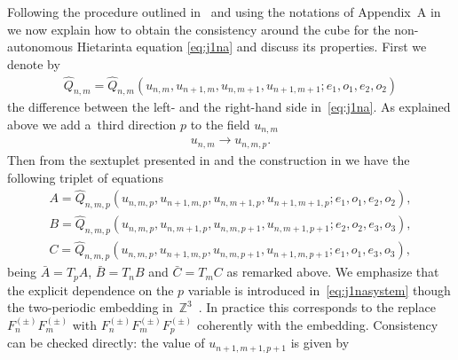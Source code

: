 \documentclass[pdftex]{sigma}
\numberwithin{equation}{section}
\newcommand{\Z}{\mathbb{Z}}
\begin{document}
Following the procedure outlined in~\cite{Boll2011,Boll2012a,Boll2012b}
and using the notations of Appendix~A in~\cite{GSL_general} we now explain
how to obtain the consistency around the cube for the
non-autonomous Hietarinta equation \eqref{eq:j1na} and discuss its
properties.
First we denote by
\begin{gather*}
 \widehat{Q}_{n,m} = \widehat{Q}_{n,m} ( u_{n,m},u_{n+1,m},u_{n,m+1},u_{n+1,m+1};e_{1},o_{1},e_{2},o_{2} ) %
\end{gather*}
the dif\/ference between the left- and the right-hand side in~\eqref{eq:j1na}. As explained above we add a~third direction $p$ to the f\/ield $u_{n,m}$
\begin{gather*}
 u_{n,m} \to u_{n,m,p}. %
\end{gather*}
Then from the sextuplet presented in \cite{Hietarinta2004}
and the construction in \cite{Boll2011,Boll2012a,Boll2012b,GSL_general}
we have the following triplet of equations
\begin{subequations} \label{eq:j1nasystem}
 \begin{gather}
 A= \widehat{Q}_{n,m,p}( u_{n,m,p},u_{n+1,m,p},u_{n,m+1,p},u_{n+1,m+1,p};e_{1},o_{1},e_{2},o_{2} ), \label{eq:j1Aeq} \\
 B= \widehat{Q}_{n,m,p}( u_{n,m,p},u_{n,m+1,p},u_{n,m,p+1},u_{n,m+1,p+1};e_{2},o_{2},e_{3},o_{3} ), \label{eq:j1Beq} \\
 C= \widehat{Q}_{n,m,p}( u_{n,m,p},u_{n+1,m,p},u_{n,m,p+1},u_{n+1,m,p+1};e_{1},o_{1},e_{3},o_{3} ), \label{eq:j1Ceq}
 \end{gather}
\end{subequations}
being $\bar{A}=T_{p}A$, $\bar{B}=T_{n}B$ and $\bar{C}=T_{m}C$
as remarked above.
We emphasize that the explicit dependence on the $p$
variable is introduced in~\eqref{eq:j1nasystem} though the
two-periodic embedding in~$\Z^{3}$~.
In practice this corresponds to the replace $F^{(\pm)}_{n}F^{(\pm)}_{m}$
with $F^{(\pm)}_{n}F^{(\pm)}_{m}F^{(\pm)}_{p}$ co\-he\-rent\-ly with the
embedding. Consistency can be checked directly: the value of $u_{n+1,m+1,p+1}$ is given by
\end{document}
